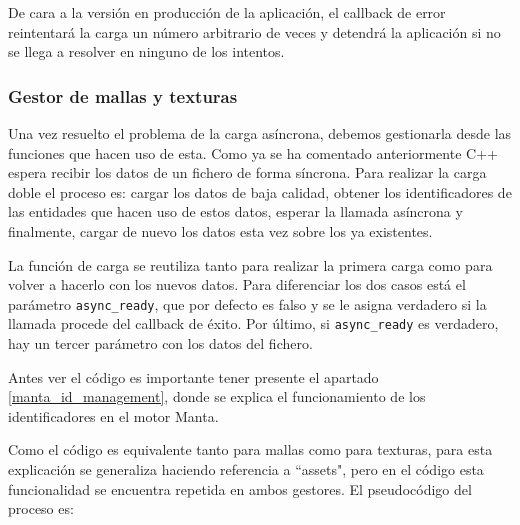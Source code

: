 De cara a la versión en producción de la aplicación, el callback de error reintentará la carga un número arbitrario de veces y detendrá la aplicación si no se llega a resolver en ninguno de los intentos.

\subsubsection{Gestor de mallas y texturas}
Una vez resuelto el problema de la carga asíncrona, debemos gestionarla desde las funciones que hacen uso de esta. Como ya se ha comentado anteriormente C++ espera recibir los datos de un fichero de forma síncrona. Para realizar la carga doble el proceso es: cargar los datos de baja calidad, obtener los identificadores de las entidades que hacen uso de estos datos, esperar la llamada asíncrona y finalmente, cargar de nuevo los datos esta vez sobre los ya existentes.

La función de carga se reutiliza tanto para realizar la primera carga como para volver a hacerlo con los nuevos datos. Para diferenciar los dos casos está el parámetro \texttt{async\_ready}, que por defecto es falso y se le asigna verdadero si la llamada procede del callback de éxito. Por último, si \texttt{async\_ready} es verdadero, hay un tercer parámetro con los datos del fichero.

Antes ver el código es importante tener presente el apartado \ref{manta_id_management}, donde se explica el funcionamiento de los identificadores en el motor Manta.

Como el código es equivalente tanto para mallas como para texturas, para esta explicación se generaliza haciendo referencia a ``assets", pero en el código esta funcionalidad se encuentra repetida en ambos gestores. El pseudocódigo del proceso es:

